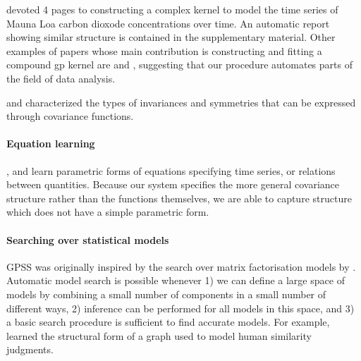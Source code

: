 \documentclass{article}
\def\eg{e.g.\ }
\begin{document}
\citet{rasmussen38gaussian} devoted 4 pages to constructing a complex kernel to model the time series of Mauna Loa carbon dioxode concentrations over time.
An automatic report showing similar structure is contained in the supplementary material.
Other examples of papers whose main contribution is constructing and fitting a compound gp{} kernel are \cite{klenske2012nonparametric} and \cite{lloydgefcom2012}, suggesting that our procedure automates parts of the field of data analysis.

\citet{kondor2008group} and \citet{Invariances13} characterized the types of invariances and symmetries that can be expressed through covariance functions.

\paragraph{Equation learning}

\citet{schmidt2009distilling}, \citet{todorovski1997declarative} and \citet{washio1999discovering} learn parametric forms of equations specifying time series, or relations between quantities.
Because our system specifies the more general covariance structure rather than the functions themselves, we are able to capture structure which does not have a simple parametric form.

\paragraph{Searching over statistical models}

GPSS was originally inspired by the search over matrix factorisation models by \citet{grosse2012exploiting}.
Automatic model search is possible whenever 1) we can define a large space of models by combining a small number of components in a small number of different ways, 2) inference can be performed for all models in this space, and 3) a basic search procedure is sufficient to find accurate models.
For example, \citet{kemp2008discovery} learned the structural form of a graph used to model human similarity judgments.  
\end{document}
